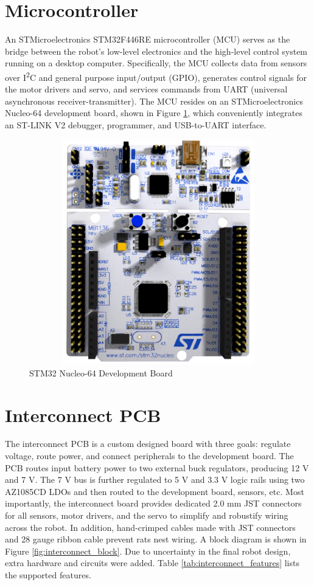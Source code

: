 \section{Microcontroller}
An STMicroelectronics STM32F446RE microcontroller (MCU) serves as the bridge between the robot's low-level electronics and the high-level control system running on a desktop computer. Specifically, the MCU collects data from sensors over I\textsuperscript{2}C and general purpose input/output (GPIO), generates control signals for the motor drivers and servo, and services commands from UART (universal asynchronous receiver-transmitter). The MCU resides on an STMicroelectronics Nucleo-64 development board, shown in Figure \ref{fig:nucleo64}, which conveniently integrates an ST-LINK V2 debugger, programmer, and USB-to-UART interface.

\begin{figure}[H]   %
	\centering \includegraphics[width=6in, height=3.85in, keepaspectratio]{figures/nucleo64.png}
	\caption{STM32 Nucleo-64 Development Board \cite{nucleo64_manual}}\label{fig:nucleo64}
\end{figure}

\section{Interconnect PCB}
The interconnect PCB is a custom designed board with three goals: regulate voltage, route power, and connect peripherals to the development board. The PCB routes input battery power to two external buck regulators, producing 12 V and 7 V. The 7 V bus is further regulated to 5 V and 3.3 V logic rails using two AZ1085CD LDOs and then routed to the development board, sensors, etc. Most importantly, the interconnect board provides dedicated 2.0 mm JST connectors for all sensors, motor drivers, and the servo to simplify and robustify wiring across the robot. In addition, hand-crimped cables made with JST connectors and 28 gauge ribbon cable prevent rats nest wiring. A block diagram is shown in Figure \ref{fig:interconnect_block}. Due to uncertainty in the final robot design, extra hardware and circuits were added. Table \ref{tab:interconnect_features} lists the supported features. 

